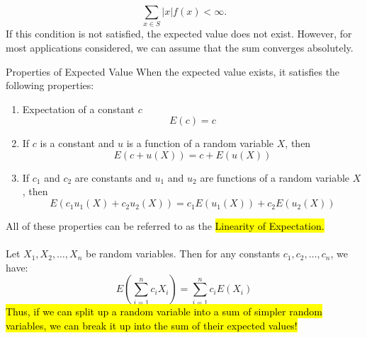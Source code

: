 ﻿\documentclass[12pt]{article}
\begin{document}
\[\sum_{x \in S} |x|f(x) < \infty.\]
If this condition is not satisfied, the expected value does not exist. However, for most applications considered, we can assume that the sum converges absolutely.
\begin{theorem}{Properties of Expected Value}
When the expected value exists, it satisfies the following properties:
\begin{enumerate}
    \item [(a)] Expectation of a constant $c$
    \[E(c) = c\]
    \item [(b)] If $c$ is a constant and $u$ is a function of a random variable $X$, then
    \[E(c + u(X)) = c + E(u(X))\]
    \item [(c)] If $c_1$ and $c_2$ are constants and $u_1$ and $u_2$ are functions of a random variable $X$, then
    \[E(c_1 u_1(X) + c_2 u_2(X)) = c_1 E(u_1(X)) + c_2 E(u_2(X))\]
\end{enumerate}
All of these properties can be referred to as the \hl{Linearity of Expectation.}\\\\
Let $X_1, X_2, \ldots, X_n$ be random variables. Then for any constants $c_1, c_2, \ldots, c_n$, we have:
\[E\left(\sum_{i=1}^n c_i X_i\right) = \sum_{i=1}^n c_i E(X_i)\]
\hl{Thus, if we can split up a random variable into a sum of simpler random variables, we can break it up into the sum of their expected values!}
\end{theorem}
\end{document}
